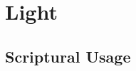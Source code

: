 \section{Light}
	\label{LIGHT}
	





\subsection{Scriptural Usage} %
	\label{LIGHT-SCRIPTURES}

	
	
